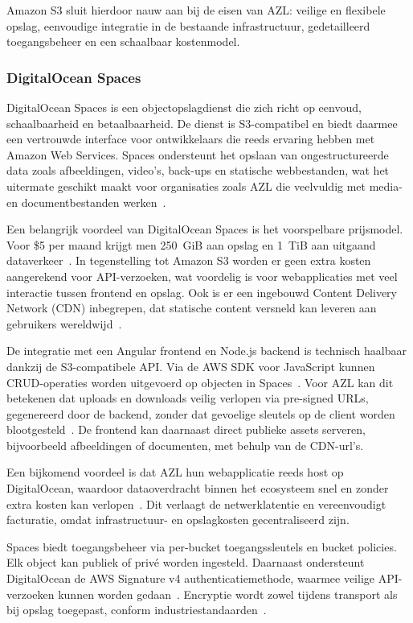 Amazon S3 sluit hierdoor nauw aan bij de eisen van AZL: veilige en flexibele opslag, eenvoudige integratie in de bestaande infrastructuur, gedetailleerd toegangsbeheer en een schaalbaar kostenmodel.

\subsubsection{DigitalOcean Spaces}
DigitalOcean Spaces is een objectopslagdienst die zich richt op eenvoud, schaalbaarheid en betaalbaarheid. De dienst is S3-compatibel en biedt daarmee een vertrouwde interface voor ontwikkelaars die reeds ervaring hebben met Amazon Web Services. Spaces ondersteunt het opslaan van ongestructureerde data zoals afbeeldingen, video's, back-ups en statische webbestanden, wat het uitermate geschikt maakt voor organisaties zoals AZL die veelvuldig met media- en documentbestanden werken~\cite{do_product}.

Een belangrijk voordeel van DigitalOcean Spaces is het voorspelbare prijsmodel. Voor \$5 per maand krijgt men 250~GiB aan opslag en 1~TiB aan uitgaand dataverkeer~\cite{do_pricing}. In tegenstelling tot Amazon S3 worden er geen extra kosten aangerekend voor API-verzoeken, wat voordelig is voor webapplicaties met veel interactie tussen frontend en opslag. Ook is er een ingebouwd Content Delivery Network (CDN) inbegrepen, dat statische content versneld kan leveren aan gebruikers wereldwijd~\cite{do_features}.

De integratie met een Angular frontend en Node.js backend is technisch haalbaar dankzij de S3-compatibele API. Via de AWS SDK voor JavaScript kunnen CRUD-operaties worden uitgevoerd op objecten in Spaces~\cite{do_sdk}. Voor AZL kan dit betekenen dat uploads en downloads veilig verlopen via pre-signed URLs, gegenereerd door de backend, zonder dat gevoelige sleutels op de client worden blootgesteld~\cite{do_security}. De frontend kan daarnaast direct publieke assets serveren, bijvoorbeeld afbeeldingen of documenten, met behulp van de CDN-url's.

Een bijkomend voordeel is dat AZL hun webapplicatie reeds host op DigitalOcean, waardoor dataoverdracht binnen het ecosysteem snel en zonder extra kosten kan verlopen~\cite{do_latency}. Dit verlaagt de netwerklatentie en vereenvoudigt facturatie, omdat infrastructuur- en opslagkosten gecentraliseerd zijn.

Spaces biedt toegangsbeheer via per-bucket toegangssleutels en bucket policies. Elk object kan publiek of privé worden ingesteld. Daarnaast ondersteunt DigitalOcean de AWS Signature v4 authenticatiemethode, waarmee veilige API-verzoeken kunnen worden gedaan~\cite{do_accesskeys}. Encryptie wordt zowel tijdens transport als bij opslag toegepast, conform industriestandaarden~\cite{do_security_model}.

